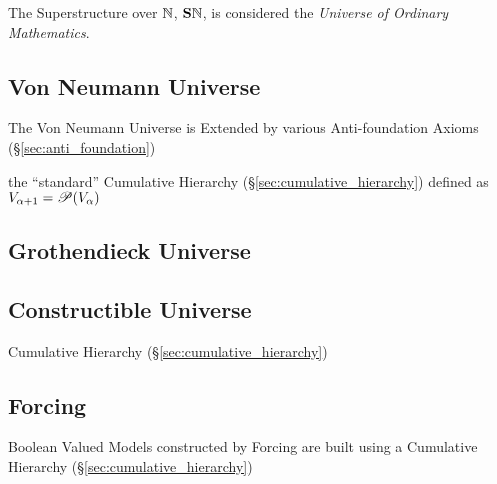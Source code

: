 The Superstructure over $\mathbb{N}$, $\mathbf{S}\mathbb{N}$, is
considered the \emph{Universe of Ordinary Mathematics}.



\subsection{Von Neumann Universe}\label{sec:vonneumann_universe}

The Von Neumann Universe is Extended by various Anti-foundation Axioms
(\S\ref{sec:anti_foundation})

the ``standard'' Cumulative Hierarchy
(\S\ref{sec:cumulative_hierarchy}) defined as $V_{\alpha+1} =
\mathscr{P}(V_\alpha)$



\subsection{Grothendieck Universe}\label{sec:grothendieck_universe}




\subsection{Constructible Universe}\label{sec:constrictible_universe}

Cumulative Hierarchy (\S\ref{sec:cumulative_hierarchy})



\subsection{Forcing}\label{sec:forcing}

Boolean Valued Models constructed by Forcing are built using a
Cumulative Hierarchy (\S\ref{sec:cumulative_hierarchy})



